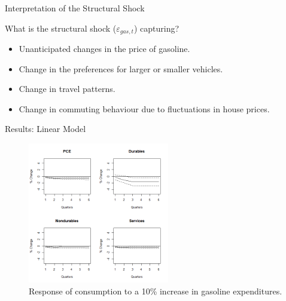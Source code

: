 \documentclass[
  10pt,
  ignorenonframetext,
]{beamer}
\begin{document}
\begin{frame}{Interpretation of the Structural Shock}
\protect\hypertarget{interpretation-of-the-structural-shock}{}

What is the structural shock (\(\varepsilon_{gas,t}\)) capturing?

\begin{itemize}
\item
  Unanticipated changes in the price of gasoline.
\item
  Change in the preferences for larger or smaller vehicles.
\item
  Change in travel patterns.
\item
  Change in commuting behaviour due to fluctuations in house prices.
\end{itemize}

\end{frame}

\begin{frame}{Results: Linear Model}
\protect\hypertarget{results-linear-model}{}

\begin{figure}
\centering
\includegraphics[width=0.55\textwidth,height=\textheight]{Aggregate.png}
\caption{Response of consumption to a 10\% increase in gasoline
expenditures.}
\end{figure}

\end{frame}
\end{document}
